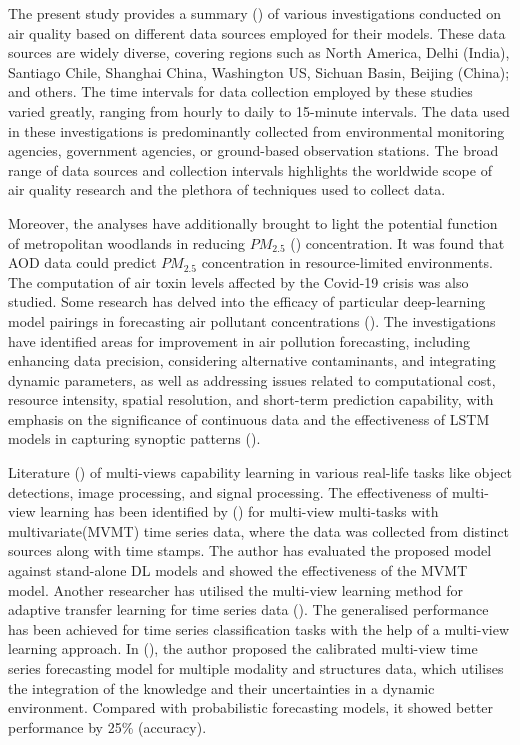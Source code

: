 \documentclass[a4paper, fleqn]{cas-sc}
\theoremstyle{definition}
\theoremstyle{remark}
\begin{document}
\par The present study provides a summary () of various investigations conducted on air quality based on different data sources employed for their models. These data sources are widely diverse, covering regions such as North America, Delhi (India), Santiago Chile, Shanghai China, Washington US, Sichuan Basin, Beijing (China); and others. The time intervals for data collection employed by these studies varied greatly, ranging from hourly to daily to 15-minute intervals. The data used in these investigations is predominantly collected from environmental monitoring agencies, government agencies, or ground-based observation stations. The broad range of data sources and collection intervals highlights the worldwide scope of air quality research and the plethora of techniques used to collect data.
\par Moreover,  the analyses have additionally brought to light the potential function of metropolitan woodlands in reducing $PM_{2.5}$ (\cite{kumar2022deep}) concentration. It was found that AOD data could predict $PM_{2.5}$ concentration in resource-limited environments. The computation of air toxin levels affected by the Covid-19 crisis was also studied. Some research has delved into the efficacy of particular deep-learning model pairings in forecasting air pollutant concentrations (\cite{du2019deep}). The investigations have identified areas for improvement in air pollution forecasting,  including enhancing data precision,  considering alternative contaminants,  and integrating dynamic parameters,  as well as addressing issues related to computational cost,  resource intensity,  spatial resolution,  and short-term prediction capability,  with emphasis on the significance of continuous data and the effectiveness of LSTM models in capturing synoptic patterns (\cite{ZHANG2022134890}).

\par Literature (\cite{YAN2021106, KUMAR2023101959, ZHANG2019158}) of multi-views capability learning in various real-life tasks like object detections, image processing, and signal processing. The effectiveness of multi-view learning has been identified by (\cite{9935292}) for multi-view multi-tasks with multivariate(MVMT) time series data, where the data was collected from distinct sources along with time stamps. The author has evaluated the proposed model against stand-alone DL models and showed the effectiveness of the MVMT model. Another researcher has utilised the multi-view learning method for adaptive transfer learning for time series data (\cite{atl2013mts}). The generalised performance has been achieved for time series classification tasks with the help of a multi-view learning approach. In (\cite{kamarthi2022camul}), the author proposed the calibrated multi-view time series forecasting model for multiple modality and structures data, which utilises the integration of the knowledge and their uncertainties in a dynamic environment. Compared with probabilistic forecasting models, it showed better performance by 25\% (accuracy).
\end{document}
